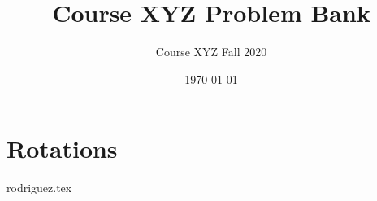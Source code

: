 \documentclass[12pt]{article}
\title{Course XYZ Problem Bank} %
\author{
Course XYZ Fall 2020
}
\date{\today}
\begin{document}
\setlength{\droptitle}{-5em}

\maketitle

\tableofcontents


\section{Rotations}

{rodriguez.tex}
\end{document}
